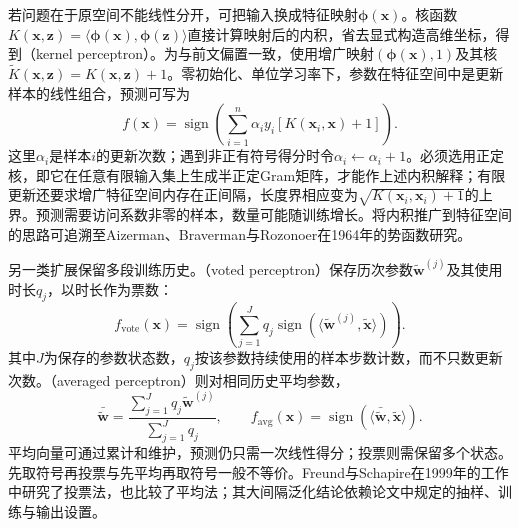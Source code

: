 若问题在于原空间不能线性分开，可把输入换成特征映射$\bm{\phi}(\bm{x})$。核函数$K(\bm{x},\bm{z})=\langle\bm{\phi}(\bm{x}),\bm{\phi}(\bm{z})\rangle$直接计算映射后的内积，省去显式构造高维坐标，得到（kernel perceptron）。为与前文偏置一致，使用增广映射$(\bm{\phi}(\bm{x}),1)$及其核$\tilde K(\bm{x},\bm{z})=K(\bm{x},\bm{z})+1$。零初始化、单位学习率下，参数在特征空间中是更新样本的线性组合，预测可写为
\begin{equation}
  \label{eq:classification-kernel-perceptron}
  f(\bm{x})=\operatorname{sign}
    \left(\sum_{i=1}^{n}\alpha_i y_i
      [K(\bm{x}_i,\bm{x})+1]\right).
\end{equation}
这里$\alpha_i$是样本$i$的更新次数；遇到非正有符号得分时令$\alpha_i\leftarrow\alpha_i+1$。必须选用正定核，即它在任意有限输入集上生成半正定Gram矩阵，才能作上述内积解释；有限更新还要求增广特征空间内存在正间隔，长度界相应变为$\sqrt{K(\bm{x}_i,\bm{x}_i)+1}$的上界。预测需要访问系数非零的样本，数量可能随训练增长。将内积推广到特征空间的思路可追溯至Aizerman、Braverman与Rozonoer在1964年的势函数研究。

另一类扩展保留多段训练历史。（voted perceptron）保存历次参数$\tilde{\bm{w}}^{(j)}$及其使用时长$q_j$，以时长作为票数：
\[
  f_{\mathrm{vote}}(\bm{x})
    =\operatorname{sign}\left(
      \sum_{j=1}^{J}q_j
        \operatorname{sign}
          (\langle\tilde{\bm{w}}^{(j)},\tilde{\bm{x}}\rangle)
      \right).
\]
其中$J$为保存的参数状态数，$q_j$按该参数持续使用的样本步数计数，而不只数更新次数。（averaged perceptron）则对相同历史平均参数，
\[
  \bar{\tilde{\bm{w}}}
    =\frac{\sum_{j=1}^{J}q_j\tilde{\bm{w}}^{(j)}}
      {\sum_{j=1}^{J}q_j},
  \qquad
  f_{\mathrm{avg}}(\bm{x})
    =\operatorname{sign}
       (\langle\bar{\tilde{\bm{w}}},\tilde{\bm{x}}\rangle).
\]
平均向量可通过累计和维护，预测仍只需一次线性得分；投票则需保留多个状态。先取符号再投票与先平均再取符号一般不等价。Freund与Schapire在1999年的工作中研究了投票法，也比较了平均法；其大间隔泛化结论依赖论文中规定的抽样、训练与输出设置。

